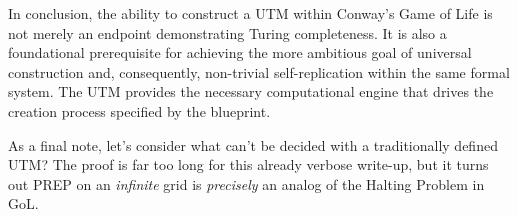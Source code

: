 \documentclass{article}
\theoremstyle{definition}
\theoremstyle{plain}
\theoremstyle{plain}
\begin{document}
In conclusion, the ability to construct a UTM within Conway's Game of Life is not merely an endpoint demonstrating Turing completeness. It is also a foundational prerequisite for achieving the more ambitious goal of universal construction and, consequently, non-trivial self-replication within the same formal system. The UTM provides the necessary computational engine that drives the creation process specified by the blueprint.

As a final note, let's consider what can't be decided with a traditionally defined UTM? The proof is far too long for this already verbose write-up, but it turns out PREP on an \textit{infinite} grid is \textit{precisely} an analog of the Halting Problem in GoL.

\printbibliography
\end{document}
